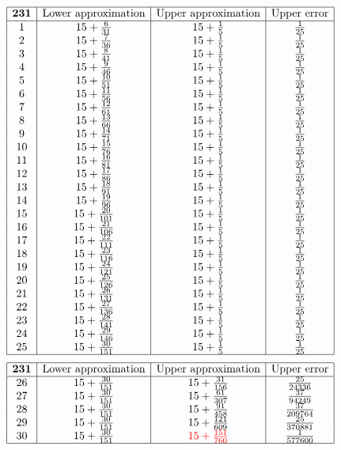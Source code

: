 \documentclass{amsart}
\begin{document}
$$\begin{array}{|c|c|c|c|}
 \hline
 {\bf 231}&\text{Lower approximation}&\text{Upper approximation}&\text{Upper error}\\
 \hline
 1&15+\frac{6}{31}&15+\frac{1}{5}&\frac{1}{25}\\
2&15+\frac{7}{36}&15+\frac{1}{5}&\frac{1}{25}\\
3&15+\frac{8}{41}&15+\frac{1}{5}&\frac{1}{25}\\
4&15+\frac{9}{46}&15+\frac{1}{5}&\frac{1}{25}\\
5&15+\frac{10}{51}&15+\frac{1}{5}&\frac{1}{25}\\
6&15+\frac{11}{56}&15+\frac{1}{5}&\frac{1}{25}\\
7&15+\frac{12}{61}&15+\frac{1}{5}&\frac{1}{25}\\
8&15+\frac{13}{66}&15+\frac{1}{5}&\frac{1}{25}\\
9&15+\frac{14}{71}&15+\frac{1}{5}&\frac{1}{25}\\
10&15+\frac{15}{76}&15+\frac{1}{5}&\frac{1}{25}\\
11&15+\frac{16}{81}&15+\frac{1}{5}&\frac{1}{25}\\
12&15+\frac{17}{86}&15+\frac{1}{5}&\frac{1}{25}\\
13&15+\frac{18}{91}&15+\frac{1}{5}&\frac{1}{25}\\
14&15+\frac{19}{96}&15+\frac{1}{5}&\frac{1}{25}\\
15&15+\frac{20}{101}&15+\frac{1}{5}&\frac{1}{25}\\
16&15+\frac{21}{106}&15+\frac{1}{5}&\frac{1}{25}\\
17&15+\frac{22}{111}&15+\frac{1}{5}&\frac{1}{25}\\
18&15+\frac{23}{116}&15+\frac{1}{5}&\frac{1}{25}\\
19&15+\frac{24}{121}&15+\frac{1}{5}&\frac{1}{25}\\
20&15+\frac{25}{126}&15+\frac{1}{5}&\frac{1}{25}\\
21&15+\frac{26}{131}&15+\frac{1}{5}&\frac{1}{25}\\
22&15+\frac{27}{136}&15+\frac{1}{5}&\frac{1}{25}\\
23&15+\frac{28}{141}&15+\frac{1}{5}&\frac{1}{25}\\
24&15+\frac{29}{146}&15+\frac{1}{5}&\frac{1}{25}\\
25&15+\frac{30}{151}&15+\frac{1}{5}&\frac{1}{25}\\
 \hline
\end{array}$$
$$\begin{array}{|c|c|c|c|}
 \hline
 {\bf 231}&\text{Lower approximation}&\text{Upper approximation}&\text{Upper error}\\
 \hline
26&15+\frac{30}{151}&15+\frac{31}{156}&\frac{25}{24336}\\
27&15+\frac{30}{151}&15+\frac{61}{307}&\frac{37}{94249}\\
28&15+\frac{30}{151}&15+\frac{91}{458}&\frac{37}{209764}\\
29&15+\frac{30}{151}&15+\frac{121}{609}&\frac{25}{370881}\\
30&15+\frac{30}{151}&{\color{red}15+\frac{151}{760}}&\frac{1}{577600}\\
 \hline
\end{array}$$
\end{document}
